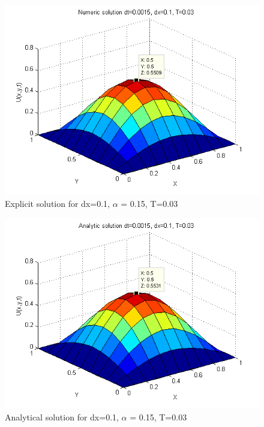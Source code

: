 \documentclass[a4paper,10pt]{article}
\begin{document}
{\begin{figure}
\end{figure}

\begin{figure}
  \begin{center}
    \includegraphics[scale=0.5]{num_dt00015_dx01_T003}
    \caption{Explicit solution for dx=0.1, $\alpha$ = 0.15, T=0.03}
    \label{fig:Num_alpha0.15}
  \end{center}

\end{figure}

\begin{figure}
  \begin{center}
    \includegraphics[scale=0.5]{ana_dt00015_dx01_T003}
    \caption{Analytical solution for dx=0.1, $\alpha$ = 0.15, T=0.03}
    \label{fig:Ana_alpha0.15}
  \end{center}


\end{figure}}
\end{document}
